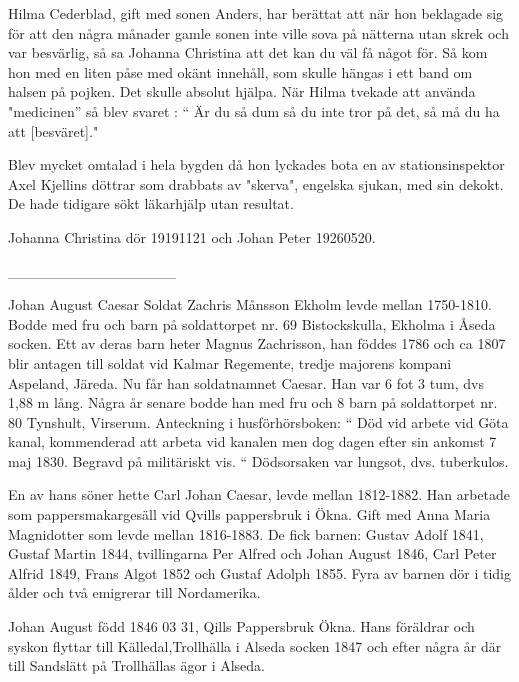 Hilma Cederblad, gift med sonen Anders, har berättat att när hon beklagade sig för att den några månader gamle sonen inte ville sova på nätterna utan skrek och var besvärlig, så sa Johanna Christina att det kan du väl få något för. Så kom hon med en liten påse med okänt innehåll, som skulle hängas i ett band om halsen på pojken. Det skulle absolut hjälpa. När Hilma tvekade att använda "medicinen'' så blev svaret : “ Är du så dum så du inte tror på det, så må du ha att [besväret]."


Blev mycket omtalad i hela bygden då hon lyckades bota en av stationsinspektor Axel Kjellins döttrar som drabbats av "skerva", engelska sjukan, med sin dekokt. De hade tidigare sökt läkarhjälp utan resultat.


Johanna Christina dör 19191121 och Johan Peter 19260520.




________________


Johan August Caesar
Soldat Zachris Månsson Ekholm levde mellan 1750-1810. Bodde med fru och barn på soldattorpet nr. 69 Bistockskulla, Ekholma i  Åseda socken. Ett av deras barn heter Magnus Zachrisson, han föddes 1786 och ca 1807 blir antagen till soldat vid Kalmar Regemente, tredje majorens kompani Aspeland, Järeda. Nu får han soldatnamnet Caesar.
Han var 6 fot 3 tum, dvs 1,88 m lång.
Några år senare bodde han med fru och 8 barn på soldattorpet nr. 80 Tynshult, Virserum.
Anteckning i husförhörsboken: “ Död vid arbete vid Göta kanal, kommenderad att arbeta vid kanalen men dog dagen efter sin ankomst 7 maj 1830. Begravd på militäriskt vis. “
Dödsorsaken var lungsot, dvs. tuberkulos.


En av hans söner hette Carl Johan Caesar, levde mellan 1812-1882. Han arbetade som pappersmakargesäll vid Qvills pappersbruk i Ökna. Gift med Anna Maria Magnidotter som levde mellan 1816-1883.
De fick barnen: Gustav Adolf 1841, Gustaf Martin 1844, tvillingarna Per Alfred och Johan August 1846, Carl Peter Alfrid 1849, Frans Algot 1852 och Gustaf Adolph 1855.
Fyra av barnen dör i tidig ålder och två emigrerar till Nordamerika.










Johan August född 1846 03 31, Qills Pappersbruk Ökna. Hans föräldrar och syskon flyttar till Källedal,Trollhälla i Alseda socken 1847 och efter några år där till Sandslätt på Trollhällas ägor i Alseda.




